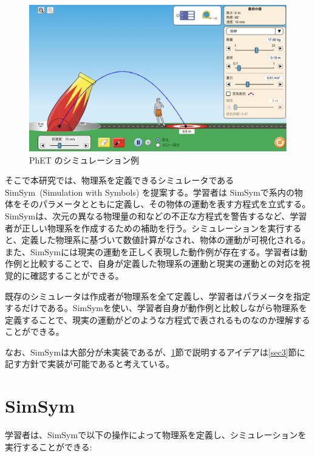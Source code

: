 \documentclass[11pt, a4paper, oneside, twocolumn, dvipdfmx]{jsarticle}
\newcommand{\simname}{SimSym}
\newcommand{\simnamealt}{Simulation with Symbols}
\begin{document}
\begin{figure}[thb]
\centering
\includegraphics*[width=0.9\linewidth]{figure/PhET_example.png}
\caption{PhET のシミュレーション例} \label{numeral_based}
\end{figure}

そこで本研究では、物理系を定義できるシミュレータである \simname~(\simnamealt) を提案する。学習者は \simname で系内の物体をそのパラメータとともに定義し、その物体の運動を表す方程式を立式する。\simname は、次元の異なる物理量の和などの不正な方程式を警告するなど、学習者が正しい物理系を作成するための補助を行う。シミュレーションを実行すると、定義した物理系に基づいて数値計算がなされ、物体の運動が可視化される。また、\simname には現実の運動を正しく表現した動作例が存在する。学習者は動作例と比較することで、自身が定義した物理系の運動と現実の運動との対応を視覚的に確認することができる。

既存のシミュレータは作成者が物理系を全て定義し、学習者はパラメータを指定するだけである。\simname を使い、学習者自身が動作例と比較しながら物理系を定義することで、現実の運動がどのような方程式で表されるものなのか理解することができる。


なお、\simname は大部分が未実装であるが、\ref{sec2}節で説明するアイデアは\ref{sec3}節に記す方針で実装が可能であると考えている。

\section{\simname} \label{sec2}

学習者は、\simname で以下の操作によって物理系を定義し、シミュレーションを実行することができる:
\end{document}
